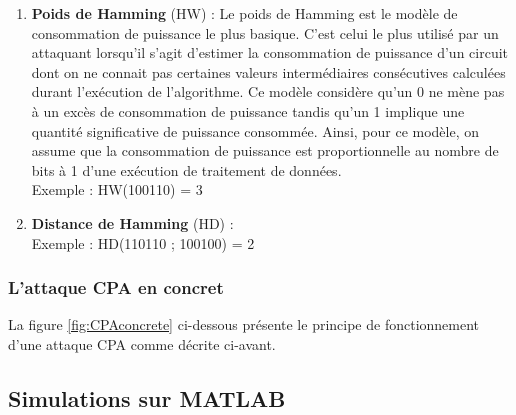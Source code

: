 \documentclass[10pt, oneside, a4paper]{article}
\begin{document}
\begin{enumerate}
\item \textbf{Poids de Hamming} (HW) : Le poids de Hamming est le modèle de consommation de puissance le plus basique. C'est celui le plus utilisé par un attaquant lorsqu'il s'agit d'estimer la consommation de puissance d'un circuit dont on ne connait pas certaines valeurs intermédiaires consécutives calculées durant l'exécution de l'algorithme. Ce modèle considère qu'un 0 ne mène pas à un excès de consommation de puissance tandis qu'un 1 implique une quantité significative de puissance consommée. Ainsi, pour ce modèle, on assume que la consommation de puissance est proportionnelle au nombre de bits à 1 d'une exécution de traitement de données. \\
Exemple : HW(100110) = 3
\item \textbf{Distance de Hamming} (HD) : \\
Exemple : HD(110110 ; 100100) = 2
\end{enumerate}



\subsubsection{L'attaque CPA en concret}
\label{sec:CPAEntire}

La figure \ref{fig:CPAconcrete} ci-dessous présente le principe de fonctionnement d'une attaque CPA comme décrite ci-avant.

\newpage

\subsection{Simulations sur MATLAB}
\end{document}
